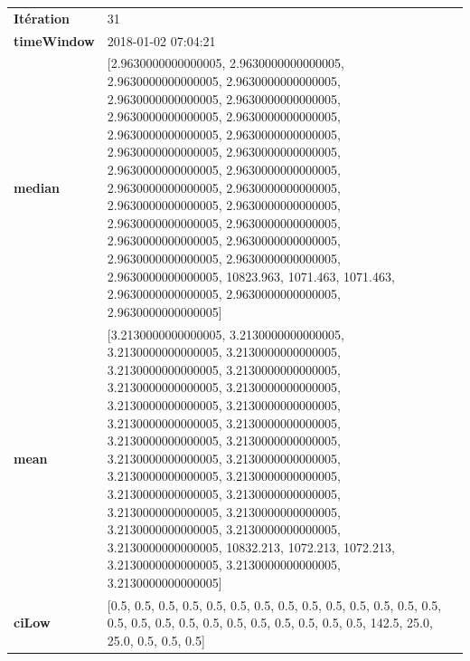 \begin{table}[H]
	\centering
	\begin{tabularx}{\textwidth}{lX}
		\textbf{Itération}& 31\\
		\textbf{timeWindow} &2018-01-02 07:04:21 \\
		
		\textbf{median}& [2.9630000000000005, 2.9630000000000005, 2.9630000000000005, 2.9630000000000005, 2.9630000000000005, 2.9630000000000005, 2.9630000000000005, 2.9630000000000005, 2.9630000000000005, 2.9630000000000005, 2.9630000000000005, 2.9630000000000005, 2.9630000000000005, 2.9630000000000005, 2.9630000000000005, 2.9630000000000005, 2.9630000000000005, 2.9630000000000005, 2.9630000000000005, 2.9630000000000005, 2.9630000000000005, 2.9630000000000005, 2.9630000000000005, 2.9630000000000005, 2.9630000000000005, 10823.963, 1071.463, 1071.463, 2.9630000000000005, 2.9630000000000005, 2.9630000000000005] \\
		\textbf{mean} & [3.2130000000000005, 3.2130000000000005, 3.2130000000000005, 3.2130000000000005, 3.2130000000000005, 3.2130000000000005, 3.2130000000000005, 3.2130000000000005, 3.2130000000000005, 3.2130000000000005, 3.2130000000000005, 3.2130000000000005, 3.2130000000000005, 3.2130000000000005, 3.2130000000000005, 3.2130000000000005, 3.2130000000000005, 3.2130000000000005, 3.2130000000000005, 3.2130000000000005, 3.2130000000000005, 3.2130000000000005, 3.2130000000000005, 3.2130000000000005, 3.2130000000000005, 10832.213, 1072.213, 1072.213, 3.2130000000000005, 3.2130000000000005, 3.2130000000000005] \\
		\textbf{ciLow}& [0.5, 0.5, 0.5, 0.5, 0.5, 0.5, 0.5, 0.5, 0.5, 0.5, 0.5, 0.5, 0.5, 0.5, 0.5, 0.5, 0.5, 0.5, 0.5, 0.5, 0.5, 0.5, 0.5, 0.5, 0.5, 142.5, 25.0, 25.0, 0.5, 0.5, 0.5]\\ 
							\end{tabularx} 
						\end{table}
						
